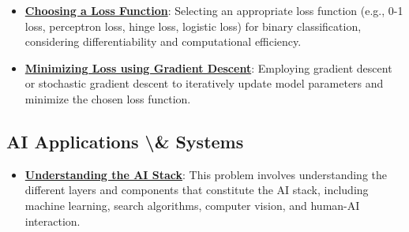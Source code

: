 \documentclass{article}%
\begin{document}
\begin{itemize}[leftmargin=*]
\item \href{https://purdue.brightspace.com/d2l/common/assets/pdfjs-d2l-dist/1.0.14-legacy/web/viewer.html?file=%2Fcontent%2Fenforced%2F1095467-wl.202510.CS.24300.001%2F05L2-ML Basics.pdf%3Fou%3D1095467&lang=en-us&container=d2l-fileviewer-rendered-pdf&fullscreen=d2l-fileviewer-rendered-pdf-dialog&height=667#page=25}{\textbf{Choosing a Loss Function}}: Selecting an appropriate loss function (e.g., 0-1 loss, perceptron loss, hinge loss, logistic loss) for binary classification, considering differentiability and computational efficiency.%
\item \href{https://purdue.brightspace.com/d2l/common/assets/pdfjs-d2l-dist/1.0.14-legacy/web/viewer.html?file=%2Fcontent%2Fenforced%2F1095467-wl.202510.CS.24300.001%2F05L2-ML Basics.pdf%3Fou%3D1095467&lang=en-us&container=d2l-fileviewer-rendered-pdf&fullscreen=d2l-fileviewer-rendered-pdf-dialog&height=667#page=28}{\textbf{Minimizing Loss using Gradient Descent}}: Employing gradient descent or stochastic gradient descent to iteratively update model parameters and minimize the chosen loss function.%
\end{itemize}

%
\subsection{AI Applications \textbackslash{}\& Systems}%
\label{subsec:AIApplicationsSystems}%
\begin{itemize}[leftmargin=*]%
\item \href{https://purdue.brightspace.com/d2l/common/assets/pdfjs-d2l-dist/1.0.14-legacy/web/viewer.html?file=%2Fcontent%2Fenforced%2F1095467-wl.202510.CS.24300.001%2F02L2-Intro.pdf%3Fou%3D1095467&lang=en-us&container=d2l-fileviewer-rendered-pdf&fullscreen=d2l-fileviewer-rendered-pdf-dialog&height=667#page=44}{\textbf{Understanding the AI Stack}}: This problem involves understanding the different layers and components that constitute the AI stack, including machine learning, search algorithms, computer vision, and human-AI interaction.%
\end{itemize}

%
\end{document}

